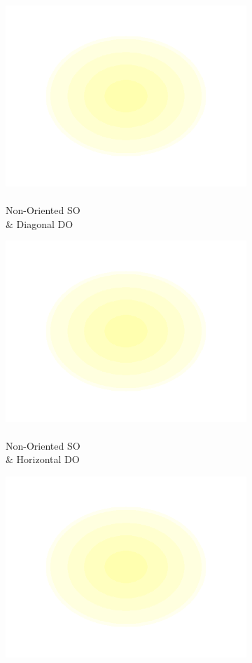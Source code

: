 \documentclass[journal,onecolumn]{IEEEtran}
\begin{document}
\begin{figure}[h]
\begin{subfigure}[b]{0.2\textwidth}
            \includegraphics[width=.85\linewidth]{map-j_4_2}
            \caption{\\ Non-Oriented SO \\ \& Diagonal DO}
    \end{subfigure}%
    \begin{subfigure}[b]{0.2\textwidth}
            \centering
            \captionsetup{justification=centering}
            \includegraphics[width=.85\linewidth]{map-j_4_3}
            \caption{\\ Non-Oriented SO \\ \& Horizontal DO}
    \end{subfigure}
    \begin{subfigure}[b]{0.2\textwidth}
            \centering
            \captionsetup{justification=centering}
            \includegraphics[width=.85\linewidth]{map-j_4_4}

\end{subfigure}
\end{figure}
\end{document}
